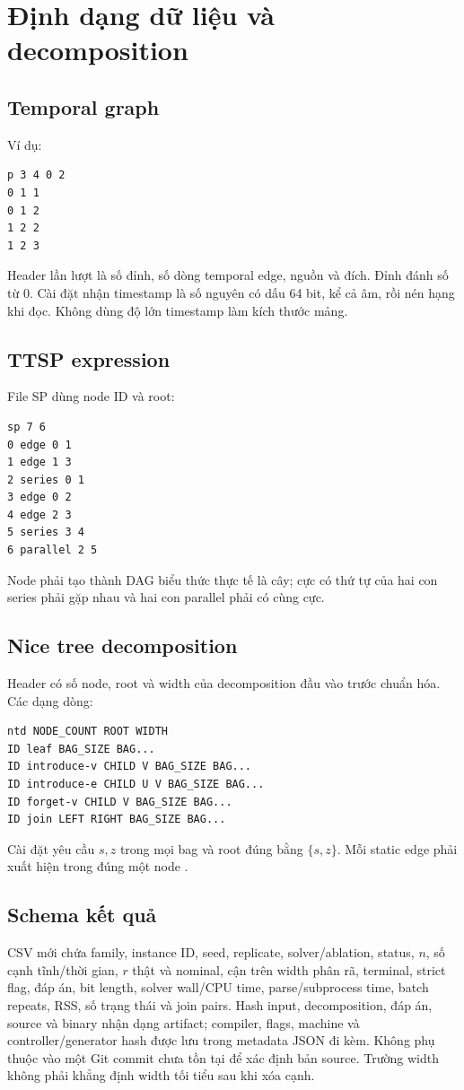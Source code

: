 \chapter{Định dạng dữ liệu và decomposition}

\section{Temporal graph}

Ví dụ:
\begin{lstlisting}[numbers=none]
p 3 4 0 2
0 1 1
0 1 2
1 2 2
1 2 3
\end{lstlisting}
Header lần lượt là số đỉnh, số dòng temporal edge, nguồn và đích. Đỉnh đánh số từ $0$. Cài đặt nhận timestamp là số nguyên có dấu 64 bit, kể cả âm, rồi nén hạng khi đọc. Không dùng độ lớn timestamp làm kích thước mảng.

\section{TTSP expression}

File SP dùng node ID và root:
\begin{lstlisting}[numbers=none]
sp 7 6
0 edge 0 1
1 edge 1 3
2 series 0 1
3 edge 0 2
4 edge 2 3
5 series 3 4
6 parallel 2 5
\end{lstlisting}
Node phải tạo thành DAG biểu thức thực tế là cây; cực có thứ tự của hai con series phải gặp nhau và hai con parallel phải có cùng cực.

\section{Nice tree decomposition}

Header có số node, root và width của decomposition đầu vào trước chuẩn hóa. Các dạng dòng:
\begin{lstlisting}[numbers=none]
ntd NODE_COUNT ROOT WIDTH
ID leaf BAG_SIZE BAG...
ID introduce-v CHILD V BAG_SIZE BAG...
ID introduce-e CHILD U V BAG_SIZE BAG...
ID forget-v CHILD V BAG_SIZE BAG...
ID join LEFT RIGHT BAG_SIZE BAG...
\end{lstlisting}
Cài đặt yêu cầu $s,z$ trong mọi bag và root đúng bằng $\{s,z\}$. Mỗi static edge phải xuất hiện trong đúng một node .

\section{Schema kết quả}

CSV mới chứa family, instance ID, seed, replicate, solver/ablation, status, $n$, số cạnh tĩnh/thời gian, $r$ thật và nominal, cận trên width phân rã, terminal, strict flag, đáp án, bit length, solver wall/CPU time, parse/subprocess time, batch repeats, RSS, số trạng thái và join pairs. Hash input, decomposition, đáp án, source và binary nhận dạng artifact; compiler, flags, machine và controller/generator hash được lưu trong metadata JSON đi kèm. Không phụ thuộc vào một Git commit chưa tồn tại để xác định bản source. Trường width không phải khẳng định width tối tiểu sau khi xóa cạnh.
